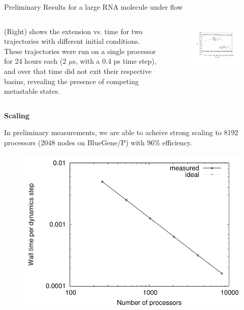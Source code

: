 \documentclass[final]{beamer}
\begin{document}
\begin{columns}[t]
\begin{column}{.33\linewidth}
\begin{block}{Preliminary Results for a large RNA molecule under flow}
\begin{columns}[t]
\begin{column}{.35\linewidth}
	      (Right) shows the extension vs. time for two trajectories with different initial conditions.  
	      These trajectories were run on a single processor for 24 hours each (2 $\mu$s, with a 0.4 ps time step), and over that time did not exit their respective basins, revealing the presence of competing metastable states.
	    \end{column}
	    \begin{column}{.6\linewidth}
	      \begin{figure}
		\includegraphics[width=8 in]{images/ext_fig.pdf}
	      \end{figure}
	    \end{column}

	  \end{columns}	  

	  \textbf{Scaling}

	  In preliminary measurements, we are able to acheive strong scaling to 8192 processors (2048 nodes on BlueGene/P) with 96\% efficiency.

	  \begin{figure}
	    \includegraphics[width=6 in]{images/scale.pdf}
	  \end{figure}


\end{block}
\end{column}
\end{columns}
\end{document}
